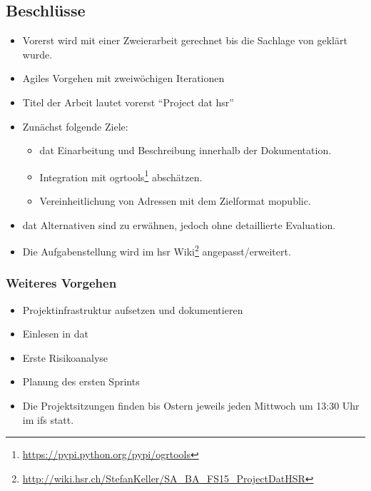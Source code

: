 \documentclass[class=scrbook,crop=false]{standalone}
\begin{document}
	\subsection*{Beschlüsse}
	\begin{itemize}
		\item Vorerst wird mit einer Zweierarbeit gerechnet bis die Sachlage von \chu geklärt wurde.
		\item Agiles Vorgehen mit zweiwöchigen Iterationen
		\item Titel der Arbeit lautet vorerst ``Project dat \acs{hsr}''
		\item Zunächst folgende Ziele:
		\begin{itemize}
			\item \gls{dat} Einarbeitung und Beschreibung innerhalb der Dokumentation.
			\item Integration mit ogrtools\footnote{\url{https://pypi.python.org/pypi/ogrtools}} abschätzen.
			\item Vereinheitlichung von Adressen mit dem Zielformat \gls{mopublic}.
		\end{itemize}
		\item \gls{dat} Alternativen sind zu erwähnen, jedoch ohne detaillierte Evaluation.
		\item Die Aufgabenstellung wird im \acs{hsr} Wiki\footnote{\url{http://wiki.hsr.ch/StefanKeller/SA_BA_FS15_ProjectDatHSR}} angepasst/erweitert.
	\end{itemize}
	
	\subsubsection*{Weiteres Vorgehen}
	\begin{itemize}
		\item Projektinfrastruktur aufsetzen und dokumentieren
		\item Einlesen in \gls{dat}
		\item Erste Risikoanalyse
		\item Planung des ersten Sprints
		\item Die Projektsitzungen finden bis Ostern jeweils jeden Mittwoch um 13:30 Uhr im \acs{ifs} statt.
	\end{itemize}
	
\end{document}
